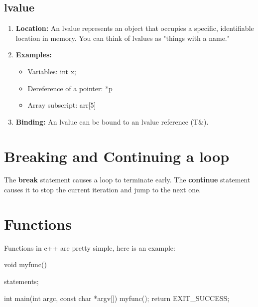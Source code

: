 \documentclass{report}
\begin{document}
    \bigbreak \noindent 
    \subsection{lvalue}
    \bigbreak \noindent 
    \begin{enumerate}
        \item \textbf{Location:} An lvalue represents an object that occupies a specific, identifiable location in memory. You can think of lvalues as "things with a name."
        \item \textbf{Examples:}
            \begin{itemize}
                \item Variables: int x;
                \item Dereference of a pointer: *p
                \item Array subscript: arr[5]
            \end{itemize}
        \item \textbf{Binding:} An lvalue can be bound to an lvalue reference (T\&).
        
    \end{enumerate}







    \pagebreak \bigbreak \noindent 
    \section{\LARGE Breaking and Continuing a loop}
    \bigbreak \noindent 
    \begin{concept}
 The \textbf{break} statement causes a loop to terminate early. The \textbf{continue} statement causes it to stop the current iteration and jump to the next one.
	\end{concept}

    \pagebreak \bigbreak \noindent 
    \section{\LARGE Functions}
    \bigbreak \noindent 
    Functions in c++ are pretty simple, here is an example:
    \bigbreak \noindent 
    
    \begin{cppcode}
void myfunc() {
    statements;

}
int main(int argc, const char *argv[]){ myfunc(); return EXIT_SUCCESS; }
    \end{cppcode}
    
\end{document}

